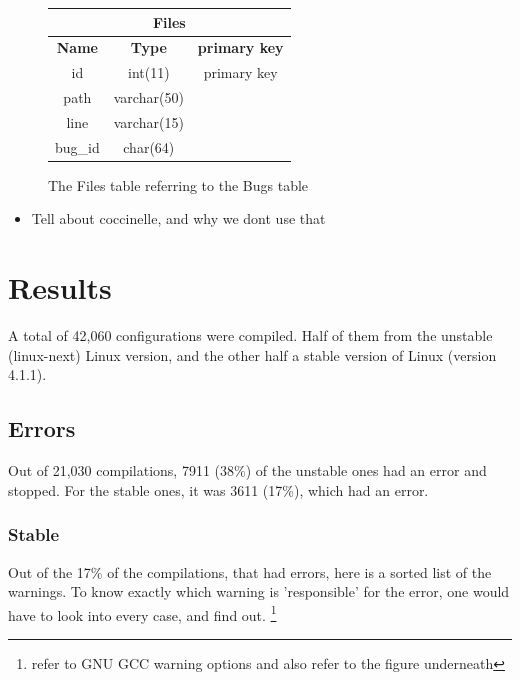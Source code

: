 \documentclass[a4paper,11pt]{report}
\newcommand{\figa}{
    \begin{figure}[!htpb]
    \centering
}
\newcommand{\figb}[2]{
    \caption{#1}
    \label{#2}
    \end{figure}
}
\begin{document}
\figa
    \begin{tabular}{c|c|c}
        \hline
        \hline
        \multicolumn{3}{c}{\textbf{Files}} \\
        \hline
        \textbf{Name} & \textbf{Type} &\textbf{primary key} \\
        \hline
        id & int(11) & primary key \\
        path & varchar(50) \\
        line & varchar(15) \\
        bug\_id & char(64) \\
        \hline
        \hline
    \end{tabular}
\figb{The Files table referring to the Bugs table}{fig:filestable}

\begin{itemize}
    \item Tell about coccinelle, and why we dont use that
\end{itemize}




\newpage
\chapter{Results}

A total of 42,060 configurations were compiled. Half of them from the unstable 
(linux-next) Linux version, and the other half a stable version of Linux 
(version 4.1.1).

    \section{Errors}

Out of 21,030 compilations, 7911 (38\%) of the unstable ones had an error and 
stopped. For the stable ones, it was 3611 (17\%), which had an error.

    \subsection{Stable}

Out of the 17\% of the compilations, that had errors, here is a sorted list of 
the warnings. To know exactly which warning is 'responsible' for the error, 
one would have to look into every case, and find out.
    \footnote{refer to GNU GCC warning options and also refer to the figure 
        underneath}
\end{document}
